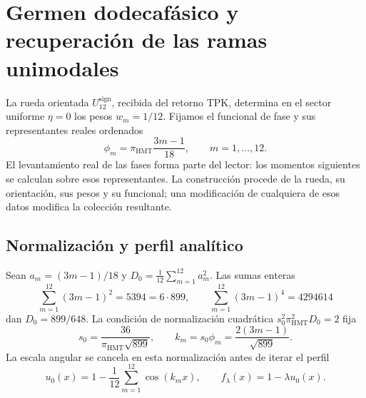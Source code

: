 \section{Germen dodecafásico y recuperación de las ramas unimodales}
\label{corpus9:iv:germen}

La rueda orientada \(U_{12}^{\mathrm{sign}}\), recibida del retorno
TPK, determina en el sector uniforme \(\eta=0\) los pesos
\(w_m=1/12\). Fijamos el funcional de fase y sus representantes
reales ordenados
\begin{equation}
 \phi_m=\pi_{\mathrm{HMT}}\frac{3m-1}{18},
 \qquad m=1,\ldots,12.
 \label{corpus9:iv:germen-fases}
\end{equation}
El levantamiento real de las fases forma parte del lector:
los momentos siguientes se calculan sobre esos representantes.
La construcción procede de la rueda, su orientación, sus pesos
y su funcional; una modificación de cualquiera de esos datos
modifica la colección resultante.

\subsection{Normalización y perfil analítico}
Sean \(a_m=(3m-1)/18\) y
\(D_0=\frac1{12}\sum_{m=1}^{12}a_m^2\). Las sumas enteras
\[
 \sum_{m=1}^{12}(3m-1)^2=5394=6\cdot899,\qquad
 \sum_{m=1}^{12}(3m-1)^4=4294614
\]
dan \(D_0=899/648\). La condición de normalización cuadrática
\(s_0^2\pi_{\mathrm{HMT}}^2D_0=2\) fija
\[
 s_0=\frac{36}{\pi_{\mathrm{HMT}}\sqrt{899}},
 \qquad k_m=s_0\phi_m=\frac{2(3m-1)}{\sqrt{899}}.
\]
La escala angular se cancela en esta normalización antes de
iterar el perfil
\begin{equation}
 u_0(x)=1-\frac1{12}\sum_{m=1}^{12}\cos(k_mx),
 \qquad f_\lambda(x)=1-\lambda u_0(x).
 \label{corpus9:iv:germen-perfil}
\end{equation}


